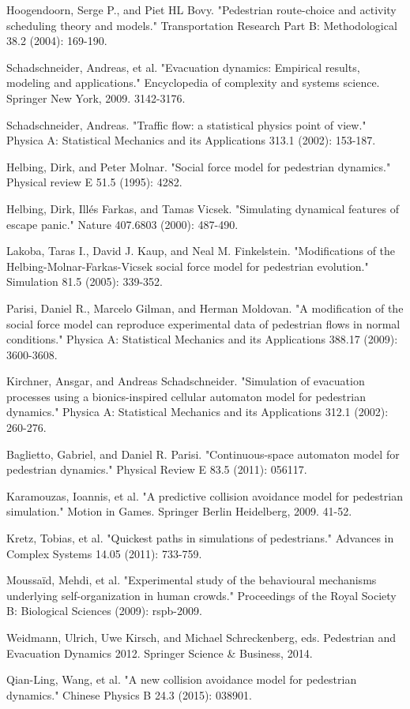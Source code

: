 \documentclass[english]{article}
\begin{document}
\begin{thebibliography}{10}

 Hoogendoorn, Serge P., and Piet HL Bovy. "Pedestrian route-choice and activity scheduling theory and models." Transportation Research Part B: Methodological 38.2 (2004): 169-190.

 Schadschneider, Andreas, et al. "Evacuation dynamics: Empirical results, modeling and applications." Encyclopedia of complexity and systems science. Springer New York, 2009. 3142-3176. 

 Schadschneider, Andreas. "Traffic flow: a statistical physics point of view." Physica A: Statistical Mechanics and its Applications 313.1 (2002): 153-187.

 Helbing, Dirk, and Peter Molnar. "Social force model for pedestrian dynamics." Physical review E 51.5 (1995): 4282.

 Helbing, Dirk, Illés Farkas, and Tamas Vicsek. "Simulating dynamical features of escape panic." Nature 407.6803 (2000): 487-490.

 Lakoba, Taras I., David J. Kaup, and Neal M. Finkelstein. "Modifications of the Helbing-Molnar-Farkas-Vicsek social force model for pedestrian evolution." Simulation 81.5 (2005): 339-352.

 Parisi, Daniel R., Marcelo Gilman, and Herman Moldovan. "A modification of the social force model can reproduce experimental data of pedestrian flows in normal conditions." Physica A: Statistical Mechanics and its Applications 388.17 (2009): 3600-3608.

 Kirchner, Ansgar, and Andreas Schadschneider. "Simulation of evacuation processes using a bionics-inspired cellular automaton model for pedestrian dynamics." Physica A: Statistical Mechanics and its Applications 312.1 (2002): 260-276.

 Baglietto, Gabriel, and Daniel R. Parisi. "Continuous-space automaton model for pedestrian dynamics." Physical Review E 83.5 (2011): 056117.

 Karamouzas, Ioannis, et al. "A predictive collision avoidance model for pedestrian simulation." Motion in Games. Springer Berlin Heidelberg, 2009. 41-52.

 Kretz, Tobias, et al. "Quickest paths in simulations of pedestrians." Advances in Complex Systems 14.05 (2011): 733-759.

 Moussaïd, Mehdi, et al. "Experimental study of the behavioural mechanisms underlying self-organization in human crowds." Proceedings of the Royal Society B: Biological Sciences (2009): rspb-2009.

 Weidmann, Ulrich, Uwe Kirsch, and Michael Schreckenberg, eds. Pedestrian and Evacuation Dynamics 2012. Springer Science \& Business, 2014.

 Qian-Ling, Wang, et al. "A new collision avoidance model for pedestrian dynamics." Chinese Physics B 24.3 (2015): 038901.

\end{thebibliography}
\end{document}
